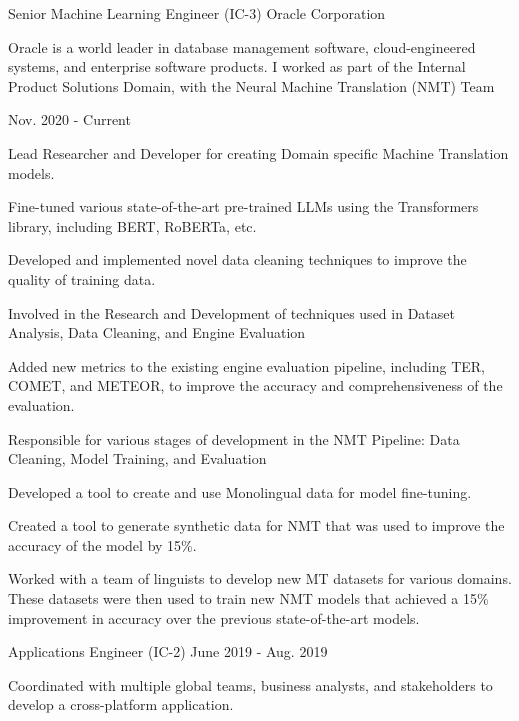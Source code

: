 \begin{cventries}
  \cvexperience
    {Senior Machine Learning Engineer (IC-3)}
    {Oracle Corporation}
    {}
    {
    \begin{cvitems}
    \hspace{-2ex}
        Oracle is a world leader in database management software, cloud-engineered systems, and enterprise software products. I worked as part of the Internal Product Solutions Domain, with the Neural Machine Translation (NMT) Team
    \end{cvitems}
    \vspace{-2ex}
    }
    {Nov. 2020 - Current}
    {
      \begin{cvitems}
        \item {Lead Researcher and Developer for creating Domain specific Machine Translation models.}
        \item {Fine-tuned various state-of-the-art pre-trained LLMs using the Transformers library, including BERT, RoBERTa, etc.}
        \item {Developed and implemented novel data cleaning techniques to improve the quality of training data.}
        \item {Involved in the Research and Development of techniques used in Dataset Analysis, Data Cleaning, and Engine Evaluation}
        \item {Added new metrics to the existing engine evaluation pipeline, including TER, COMET, and METEOR, to improve the accuracy and comprehensiveness of the evaluation.}
        \item {Responsible for various stages of development in the NMT Pipeline: Data Cleaning, Model Training, and Evaluation}
        \item {Developed a tool to create and use Monolingual data for model fine-tuning.}
        \item {Created a tool to generate synthetic data for NMT that was used to improve the accuracy of the model by 15\%.}
        \item {Worked with a team of linguists to develop new MT datasets for various domains. These datasets were then used to train new NMT models that achieved a 15\% improvement in accuracy over the previous state-of-the-art models.}
      \end{cvitems}
    }
  \cvexperiencecontinued
    {Applications Engineer (IC-2)}
    {}
    {June 2019 - Aug. 2019}
    {
      \begin{cvitems}
        \item {Coordinated with multiple global teams, business analysts, and stakeholders to develop a cross-platform application.}

\end{cvitems}}
\end{cventries}
